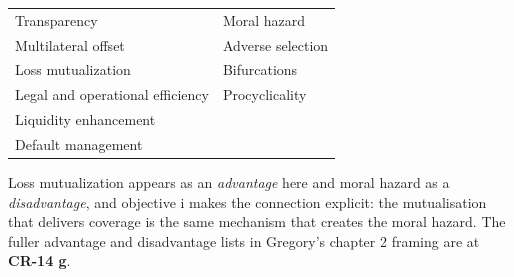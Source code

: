 
\begin{center}
\footnotesize
\begin{tabular}{L{7.0cm} L{7.5cm}}
\toprule
{} &  \\
\midrule
Transparency & Moral hazard \\
Multilateral offset & Adverse selection \\
Loss mutualization & Bifurcations \\
Legal and operational efficiency & Procyclicality \\
Liquidity enhancement & \\
Default management & \\
\bottomrule
\end{tabular}
\end{center}

\begin{crtrapbox}
Loss mutualization appears as an \emph{advantage} here and moral hazard as a
\emph{disadvantage}, and objective i makes the connection explicit: the
mutualisation that delivers coverage is the same mechanism that creates the moral
hazard. The fuller advantage and disadvantage lists in Gregory's chapter 2
framing are at \textbf{CR-14 g}.
\end{crtrapbox}
